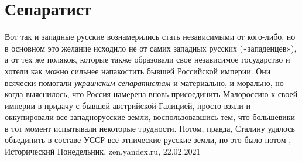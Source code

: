  
 
 
 
 
\chapter{Сепаратист}

Вот так и западные русские вознамерились стать независимыми от кого-либо, но в
основном это желание исходило не от самих западных русских («западенцев»), а от
тех же поляков, которые также образовали свое независимое государство и хотели
как можно сильнее напакостить бывшей Российской империи. Они всячески помогали
\emph{украинским сепаратистам} и материально, и морально, но когда выяснилось, что
Россия намерена вновь присоединить Малороссию к своей империи в придачу с
бывшей австрийской Галицией, просто взяли и оккупировали все западнорусские
земли, воспользовавшись тем, что большевики в тот момент испытывали некоторые
трудности. Потом, правда, Сталину удалось объединить в составе УССР все
этнические русские земли, но это было потом
, 
Исторический Понедельник, zen.yandex.ru, 22.02.2021 

